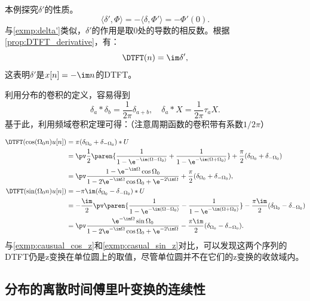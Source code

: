 \begin{example}
    本例探究$\delta'$的性质。
    \begin{equation}
        \langle \delta',\Phi\rangle=-\langle\delta,\Phi'\rangle=-\Phi'(0).
    \end{equation}
    与\cref{exmp:delta'}类似，$\delta'$的作用是取$0$处的导数的相反数。根据\cref{prop:DTFT_derivative}，有：
    \begin{equation}
        \DTFT(n)=\im\delta',
    \end{equation}
    这表明$\delta'$是$x[n]=-\im n$的DTFT。
\end{example}

利用分布的卷积的定义，容易得到
\begin{equation}
    \delta_a*\delta_b=\frac{1}{2\pi}\delta_{a+b},\quad \delta_a*X=\frac{1}{2\pi}\tau_a X.
\end{equation}
基于此，利用频域卷积定理可得：（注意周期函数的卷积带有系数$1/2\pi$）

\begin{example}
    \begin{align}
        \DTFT(\cos(\Omega_0 n)u[n])&=\pi(\delta_{\Omega_0}+\delta_{-\Omega_0})*U \nonumber \\
        &=\pv\frac{1}{2}\paren{\frac{1}{1-\e^{-\im(\Omega-\Omega_0)}}+\frac{1}{1-\e^{-\im(\Omega+\Omega_0)}}}+\frac{\pi}{2}(\delta_{\Omega_0}+\delta_{-\Omega_0}) \nonumber \\
        &=\pv\frac{1-\e^{-\im\Omega}\cos\Omega_0}{1-2\e^{-\im\Omega}\cos\Omega_0+\e^{-2\im\Omega}}+\frac{\pi}{2}(\delta_{\Omega_0}+\delta_{-\Omega_0}), \\
        \DTFT(\sin(\Omega_0 n)u[n])&=-\pi\im(\delta_{\Omega_0}-\delta_{-\Omega_0})*U \nonumber \\
        &=-\frac{\im}{2}\pv\paren{\frac{1}{1-\e^{-\im(\Omega-\Omega_0)}}-\frac{1}{1-\e^{-\im(\Omega+\Omega_0)}}}-\frac{\pi\im}{2}(\delta_{\Omega_0}-\delta_{-\Omega_0}) \nonumber \\
        &=\pv\frac{\e^{-\im\Omega}\sin\Omega_0}{1-2\e^{-\im\Omega}\cos\Omega_0+\e^{-2\im\Omega}}-\frac{\pi\im}{2}(\delta_{\Omega_0}-\delta_{-\Omega_0}).
    \end{align}
    与\cref{exmp:causual_cos_z}和\cref{exmp:casual_sin_z}对比，可以发现这两个序列的DTFT仍是z变换在单位圆上的取值，尽管单位圆并不在它们的z变换的收敛域内。
\end{example}

\subsection{分布的离散时间傅里叶变换的连续性}\label{sub:DTFT_continuous}

